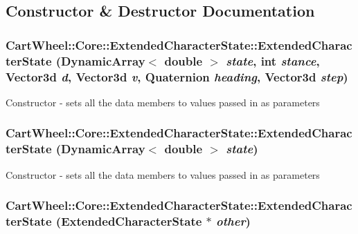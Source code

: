 \subsection{Constructor \& Destructor Documentation}
\hypertarget{classCartWheel_1_1Core_1_1ExtendedCharacterState_a4f951ea8ca2f0ff694af5439e0e6030c}{
\subsubsection[{ExtendedCharacterState}]{\setlength{\rightskip}{0pt plus 5cm}CartWheel::Core::ExtendedCharacterState::ExtendedCharacterState (DynamicArray$<$ double $>$ {\em state}, \/  int {\em stance}, \/  {\bf Vector3d} {\em d}, \/  {\bf Vector3d} {\em v}, \/  {\bf Quaternion} {\em heading}, \/  {\bf Vector3d} {\em step})}}
\label{classCartWheel_1_1Core_1_1ExtendedCharacterState_a4f951ea8ca2f0ff694af5439e0e6030c}
Constructor -\/ sets all the data members to values passed in as parameters \hypertarget{classCartWheel_1_1Core_1_1ExtendedCharacterState_a94179157b4265c585e83db25186740d3}{
\subsubsection[{ExtendedCharacterState}]{\setlength{\rightskip}{0pt plus 5cm}CartWheel::Core::ExtendedCharacterState::ExtendedCharacterState (DynamicArray$<$ double $>$ {\em state})}}
\label{classCartWheel_1_1Core_1_1ExtendedCharacterState_a94179157b4265c585e83db25186740d3}
Constructor -\/ sets all the data members to values passed in as parameters \hypertarget{classCartWheel_1_1Core_1_1ExtendedCharacterState_af5c2f7196eb4522932e5172a6e4e606d}{
\subsubsection[{ExtendedCharacterState}]{\setlength{\rightskip}{0pt plus 5cm}CartWheel::Core::ExtendedCharacterState::ExtendedCharacterState ({\bf ExtendedCharacterState} $\ast$ {\em other})}}

